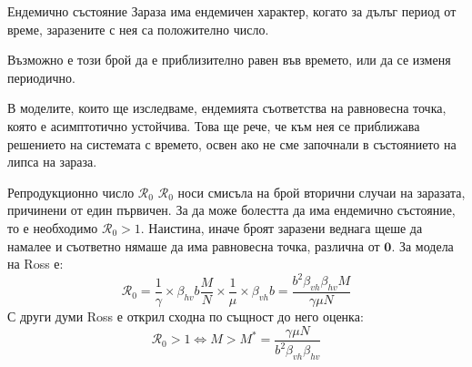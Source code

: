 \begin{frame}[t]{Ендемично състояние}
  Зараза има ендемичен характер, когато за дълъг период от време, заразените с нея са положително число.

  Възможно е този брой да е приблизително равен във времето, или да се изменя периодично.

  В моделите, които ще изследваме, ендемията съответства на равновесна точка, която е асимптотично устойчива. Това ще рече, че към нея се приближава решението на системата с времето, освен ако не сме започнали в състоянието на липса на зараза.
\end{frame}

\begin{frame}[t]{Репродукционно число $\mathscr{R}_0$}
  $\mathscr{R}_0$ носи смисъла на брой вторични случаи на заразата, причинени от един първичен. За да може болестта да има ендемично състояние, то е необходимо $\mathscr{R}_0 > 1$.
  Наистина, иначе броят заразени веднага щеше да намалее и съответно нямаше да има равновесна точка, различна от $\mathbf{0}$. За модела на Ross е:
  \begin{equation}
    \mathscr{R}_0 = \frac{1}{\gamma} \times \beta_{hv} b \frac{M}{N} \times \frac{1}{\mu} \times \beta_{vh} b = \frac{b^2 \beta_{vh} \beta_{hv} M}{\gamma \mu N}
  \end{equation}
  С други думи Ross е открил сходна по същност до него оценка:
  \begin{equation}
    \mathscr{R}_0 > 1 \iff M > M^* = \frac{\gamma \mu N}{b^2 \beta_{vh} \beta_{hv}}
  \end{equation}
\end{frame}
